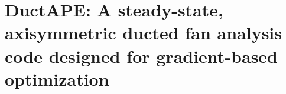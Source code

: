 \chapter{DuctAPE: A steady-state, axisymmetric ducted fan analysis code designed for gradient-based optimization}
\label{ch:ductape}






\printbibliography[keyword={ductape},heading=subbibintoc,title=Chapter \thechapter~References]
